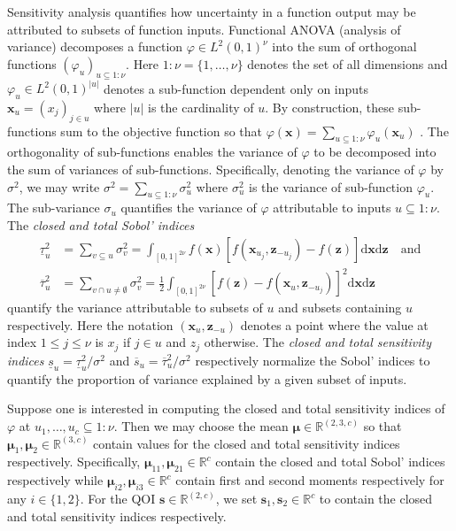 \documentclass[graybox]{svmult}
\begin{document}
Sensitivity analysis quantifies how uncertainty in a function output may be attributed to subsets of function inputs. Functional ANOVA (analysis of variance) decomposes a function $\varphi \in L^2(0,1)^\nu$ into the sum of orthogonal functions $(\varphi_u)_{u \subseteq {1:\nu}}$. Here $1:\nu=\{1,\dots,\nu\}$ denotes the set of all dimensions and $\varphi_u \in L^2(0,1)^{\lvert u \rvert}$ denotes a sub-function dependent only on inputs $\boldsymbol{x}_u = (x_j)_{j \in u}$ where $\lvert u \rvert$ is the cardinality of $u$. By construction, these sub-functions sum to the objective function so that $\varphi(\boldsymbol{x}) = \sum_{u \subseteq 1:\nu} \varphi_u(\boldsymbol{x}_u)$ \cite[Appendix A]{mcbook}. 
The orthogonality of sub-functions enables the variance of $\varphi$ to be decomposed into the sum of variances of sub-functions. Specifically, denoting the variance of $\varphi$ by $\sigma^2$, we may write $\sigma^2 = \sum_{u \subseteq 1:\nu} \sigma^2_u$ where $\sigma^2_u$ is the variance of sub-function $\varphi_u$. The sub-variance $\sigma_u$ quantifies the variance of $\varphi$ attributable to inputs $u \subseteq 1:\nu$.  The \emph{closed and total Sobol' indices}
\begin{align*}
    \underline{\tau}_u^2 &= \sum_{v \subseteq u} \sigma^2_v = \int_{[0,1]^{2\nu}} f(\boldsymbol{x})[f(\boldsymbol{x}_{u_j},\boldsymbol{z}_{-{u_j}})-f(\boldsymbol{z})]\mathrm{d}\boldsymbol{x}\mathrm{d}\boldsymbol{z} \quad \text{and}  \\ 
    \overline{\tau}_u^2 &= \sum_{v \cap u \neq \emptyset} \sigma^2_v = \frac{1}{2}\int_{[0,1]^{2\nu}} [f(\boldsymbol{z})-f(\boldsymbol{x}_u,\boldsymbol{z}_{-{u_j}})]^2\mathrm{d}\boldsymbol{x}\mathrm{d}\boldsymbol{z}
    \label{SoRa_eq:sobol_indices}
\end{align*}
quantify the variance attributable to subsets of $u$ and subsets containing $u$ respectively. Here the notation $(\boldsymbol{x}_{u},\boldsymbol{z}_{-u})$ denotes a point where the value at index $1 \leq j \leq \nu$ is $x_j$ if $j \in u$ and $z_j$ otherwise. The \emph{closed and total sensitivity indices} $\underline{s}_u = \underline{\tau}_u^2/\sigma^2$ and $\overline{s}_u = \overline{\tau}_u^2/\sigma^2$ respectively normalize the Sobol' indices to quantify the proportion of variance explained by a given subset of inputs. 

Suppose one is interested in computing the closed and total sensitivity indices of $\varphi$ at $u_1,\dots,u_c \subseteq 1:\nu$. Then we may choose the mean $\boldsymbol{\mu} \in \mathbb{R}^{(2, 3, c)}$ so that $\boldsymbol{\mu}_1,\boldsymbol{\mu}_2 \in \mathbb{R}^{(3,c)}$ contain values for the closed and total sensitivity indices respectively. Specifically,  $\boldsymbol{\mu}_{11},\boldsymbol{\mu}_{21} \in \mathbb{R}^c$ contain the closed and total Sobol' indices respectively while $\boldsymbol{\mu}_{i2}, \boldsymbol{\mu}_{i3} \in \mathbb{R}^c$ contain first and second moments respectively for any $i \in \{1,2\}$. For the QOI $\boldsymbol{s} \in \mathbb{R}^{(2, c)}$, we set $\boldsymbol{s}_1, \boldsymbol{s}_2 \in \mathbb{R}^c$ to contain the closed and total sensitivity indices respectively. 
\end{document}
